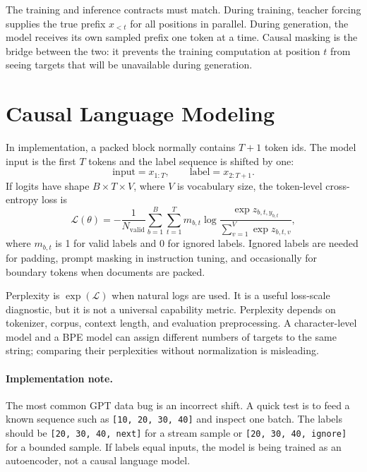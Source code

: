 The training and inference contracts must match. During training, teacher forcing supplies the true prefix $x_{<t}$ for all positions in parallel. During generation, the model receives its own sampled prefix one token at a time. Causal masking is the bridge between the two: it prevents the training computation at position $t$ from seeing targets that will be unavailable during generation.

\section{Causal Language Modeling}
\label{sec:causal-language-modeling}

In implementation, a packed block normally contains $T+1$ token ids. The model input is the first $T$ tokens and the label sequence is shifted by one:
\begin{equation}
  \mathrm{input} = x_{1:T}, \qquad
  \mathrm{label} = x_{2:T+1}.
\end{equation}
If logits have shape $B \times T \times V$, where $V$ is vocabulary size, the token-level cross-entropy loss is
\begin{equation}
  \mathcal{L}(\theta)
  = -\frac{1}{N_{\mathrm{valid}}}
    \sum_{b=1}^{B}\sum_{t=1}^{T}
      m_{b,t}\log
      \frac{\exp z_{b,t,y_{b,t}}}
           {\sum_{v=1}^{V}\exp z_{b,t,v}},
  \label{eq:gpt-cross-entropy}
\end{equation}
where $m_{b,t}$ is 1 for valid labels and 0 for ignored labels. Ignored labels are needed for padding, prompt masking in instruction tuning, and occasionally for boundary tokens when documents are packed.

Perplexity is $\exp(\mathcal{L})$ when natural logs are used. It is a useful loss-scale diagnostic, but it is not a universal capability metric. Perplexity depends on tokenizer, corpus, context length, and evaluation preprocessing. A character-level model and a BPE model can assign different numbers of targets to the same string; comparing their perplexities without normalization is misleading.

\paragraph{Implementation note.}
The most common GPT data bug is an incorrect shift. A quick test is to feed a known sequence such as \texttt{[10, 20, 30, 40]} and inspect one batch. The labels should be \texttt{[20, 30, 40, next]} for a stream sample or \texttt{[20, 30, 40, ignore]} for a bounded sample. If labels equal inputs, the model is being trained as an autoencoder, not a causal language model.

